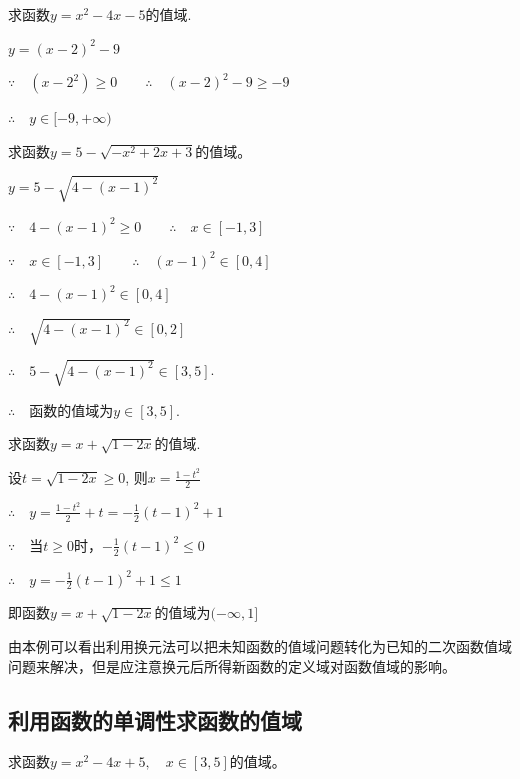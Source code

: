 \begin{example}
求函数$y=x^{2}-4x-5$的值域.    
\end{example}

\begin{solution}
    $y=(x-2)^{2}-9$

$\because\quad (x-2^{2})\ge 0\qquad \therefore\quad (x-2)^{2}-9\ge -9$

$\therefore\quad y\in[-9,+\infty)$
\end{solution}

\begin{example}
   求函数$y=5-\sqrt{-x^{2}+2x+3}$的值域。 
\end{example}

\begin{solution}
    $y=5-\sqrt{4-(x-1)^{2}}$

    $\because\quad 4-(x-1)^{2}\ge 0\qquad \therefore\quad x\in[-1,3]$

    $\because\quad  x\in[-1,3]\qquad \therefore\quad (x-1)^{2}\in [0,4]$

$\therefore\quad 4-(x-1)^{2}\in[0,4]$

$\therefore\quad\sqrt{4-(x-1)^{2}}\in[0,2]$

$\therefore\quad 5-\sqrt{4-(x-1)^{2}}\in[3,5]$.

$\therefore\quad $函数的值域为$y\in[3,5]$.
\end{solution}

\begin{example}
    求函数$y=x+\sqrt{1-2x}$的值域.
\end{example}

\begin{solution}
设$t=\sqrt{1-2x}\ge 0$, 则$x=\frac{1-t^2}{2}$

$\therefore\quad y=\frac{1-t^2}{2}+t=-\frac{1}{2}(t-1)^2+1$

$\because\quad $当$t\ge 0$时，$-\frac{1}{2}(t-1)^2\le 0$

$\therefore\quad y=-\frac{1}{2}(t-1)^2+1\le 1$

即函数$y=x+\sqrt{1-2x}$的值域为$(-\infty,1]$
\end{solution}

由本例可以看出利用换元法可以把未知函数的值域问题转化为已知的二次函数值域问题来解决，但是应注意换元后所得新函数的定义域对函数值域的影响。

\subsection{利用函数的单调性求函数的值域}
\begin{example}
    求函数$y=x^2-4x+5,\quad x\in [3,5]$的值域。
\end{example}

